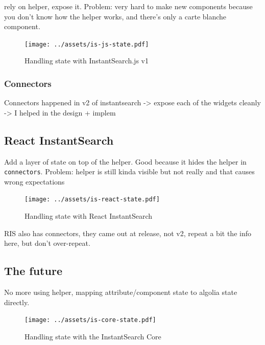 rely on helper, expose it. Problem: very hard to make new components because you don't know how the helper works, and there's only a carte blanche component. %

\begin{figure}[H]
\label{figure:is-js-state}
  \centering
  \texttt{[image: ../assets/is-js-state.pdf]}
  \caption{Handling state with InstantSearch.js v1}
\end{figure}

\subsubsection{Connectors} %
\label{ssub:instantsearch_js_connectors}

Connectors happened in v2 of instantsearch
-> expose each of the widgets cleanly
-> I helped in the design + implem %



\subsection{React InstantSearch} %
\label{sub:react_instantearch}

Add a layer of state on top of the helper. Good because it hides the helper in {\tt connectors}. Problem: helper is still kinda visible but not really and that causes wrong expectations %

\begin{figure}[H]
\label{figure:is-react-state}
  \centering
  \texttt{[image: ../assets/is-react-state.pdf]}
  \caption{Handling state with React InstantSearch}
\end{figure}

RIS also has connectors, they came out at release, not v2, repeat a bit the info here, but don't over-repeat. %


\subsection{The future} %
\label{sub:the_future}

No more using helper, mapping attribute/component state to algolia state directly. %

\begin{figure}[H]
\label{figure:is-core-state}
  \centering
  \texttt{[image: ../assets/is-core-state.pdf]}
  \caption{Handling state with the InstantSearch Core}
\end{figure}


